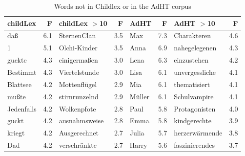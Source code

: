 \documentclass[doc, a4paper, anonymous]{apa7}
\begin{document}
\begin{table}[!htbp]
\caption{Words not in Childlex or in the AdHT corpus}
\centering
\begin{tabular}{lrlrlrlr}
  \hline
childLex & F & childLex $>$10 & F & AdHT & F & AdHT $>$10 & F \\ 
  \hline
daß & 6.1 & SternenClan & 3.5 & Max & 7.3 & Charakteren & 4.6 \\ 
  1 & 5.1 & Olchi-Kinder & 3.5 & Anna & 6.9 & nahegelegenen & 4.3 \\ 
  guckte & 4.3 & einigermaßen & 3.0 & Lena & 6.3 & einzustehen & 4.2 \\ 
  Bestimmt & 4.3 & Viertelstunde & 3.0 & Lisa & 6.1 & unvergessliche & 4.1 \\ 
  Blattsee & 4.2 & Mottenflügel & 2.9 & Mia & 6.1 & thematisiert & 4.1 \\ 
  mußte & 4.2 & stirnrunzelnd & 2.9 & Müller & 6.1 & Schulvampire & 4.1 \\ 
  Jedenfalls & 4.2 & Wolkenpfote & 2.8 & Paul & 5.8 & Protagonisten & 4.0 \\ 
  guckt & 4.2 & ausnahmsweise & 2.8 & Emma & 5.8 & kindgerechte & 3.9 \\ 
  kriegt & 4.2 & Ausgerechnet & 2.7 & Julia & 5.7 & herzerwärmende & 3.8 \\ 
  Dad & 4.2 & verschränkte & 2.7 & Harry & 5.6 & faszinierendes & 3.7 \\ 
   \hline
\end{tabular}
\label{words-adht}
\end{table}
\end{document}
